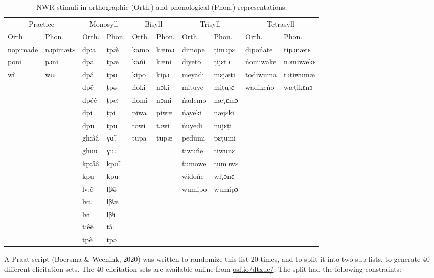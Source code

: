 \documentclass[
  american,
  ,man,floatsintext]{apa6}
\begin{document}
\begin{table}[H]

\caption{\label{tab:tabstims}NWR stimuli in orthographic (Orth.) and phonological (Phon.) representations.}
\centering
\begin{tabular}[t]{llllllllll}
\toprule
\multicolumn{2}{c}{Practice} & \multicolumn{2}{c}{Monosyll} & \multicolumn{2}{c}{Bisyll} & \multicolumn{2}{c}{Trisyll} & \multicolumn{2}{c}{Tetrasyll} \\
\cmidrule(l{3pt}r{3pt}){1-2} \cmidrule(l{3pt}r{3pt}){3-4} \cmidrule(l{3pt}r{3pt}){5-6} \cmidrule(l{3pt}r{3pt}){7-8} \cmidrule(l{3pt}r{3pt}){9-10}
Orth. & Phon. & Orth. & Phon. & Orth. & Phon. & Orth. & Phon. & Orth. & Phon.\\
\midrule
nopimade & nɔpimæṭɛ & dp:a & ṭpæ̃ & kamo & kæmɔ & dimope & ṭimɔpɛ & dipońate & ṭipɔnætɛ\\
poni & pɔni & dpa & ṭpæ & kańi & kæni & diyeto & ṭijɛtɔ & ńomiwake & nɔmiwækɛ\\
wî & wɯ & dpâ & ṭpɑ & kipo & kipɔ & meyadi & mɛjæṭi & todiwuma & tɔṭiwumæ\\
 &  & dpê & ṭpə & ńoki & nɔki & mituye & mitujɛ & wadikeńo & wæṭikɛnɔ\\
 &  & dpéé & ṭpeː & ńomi & nɔmi & ńademo & næṭɛmɔ &  & \\
\addlinespace
 &  & dpi & ṭpi & piwa & piwæ & ńayeki & næjɛki &  & \\
 &  & dpu & ṭpu & towi & tɔwi & ńuyedi & nujɛṭi &  & \\
 &  & gh:ââ & ɣɑ̃ː & tupa & tupæ & pedumi & pɛṭumi &  & \\
 &  & ghuu & ɣuː &  &  & tiwuńe & tiwunɛ &  & \\
 &  & kp:ââ & kpɑ̃ː &  &  & tumowe & tumɔwɛ &  & \\
\addlinespace
 &  & kpu & kpu &  &  & widońe & wiṭɔnɛ &  & \\
 &  & lv:ê & lβʲə̃ &  &  & wumipo & wumipɔ &  & \\
 &  & lva & lβʲæ &  &  &  &  &  & \\
 &  & lvi & lβʲi &  &  &  &  &  & \\
 &  & t:êê & tə̃ː &  &  &  &  &  & \\
\addlinespace
 &  & tpê & tpə &  &  &  &  &  & \\
\bottomrule
\end{tabular}
\end{table}

A Praat script (Boersma \& Weenink, 2020) was written to randomize this list 20 times, and to split it into two sub-lists, to generate 40 different elicitation sets. The 40 elicitation sets are available online from \href{https://osf.io/dtxue/}{osf.io/dtxue/}. The split had the following constraints:
\end{document}
